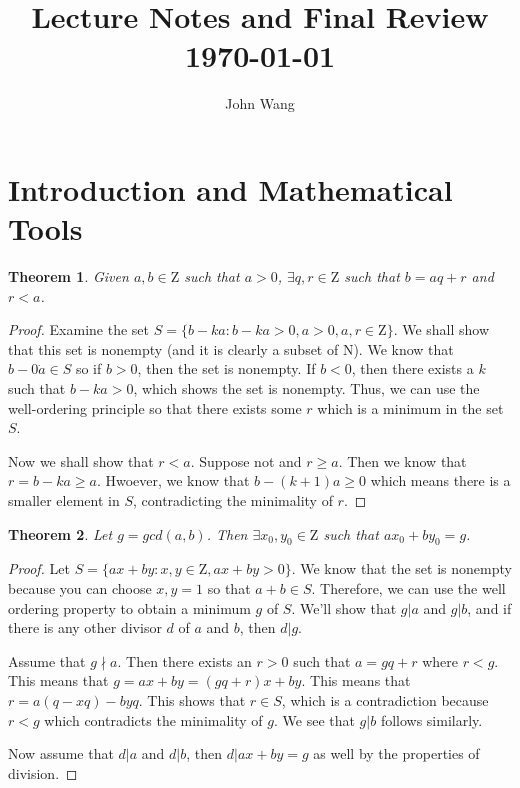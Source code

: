 \documentclass[psamsfonts]{amsart}
\title{Lecture Notes and Final Review\\
\today}
\author{John Wang}
\newtheorem{thm}{Theorem}[section]
\theoremstyle{definition}
\theoremstyle{remark}
\numberwithin{equation}{section}
\begin{document}
\maketitle


\section{Introduction and Mathematical Tools}

\begin{thm}
Given $a,b \in \mathrm{Z}$ such that $a > 0$, $\exists q, r \in \mathrm{Z}$ such that $b = aq + r$ and $r < a$. 
\end{thm}

\begin{proof}
Examine the set $S = \{ b - ka: b - ka > 0, a > 0, a,r \in \mathrm{Z} \}$. We shall show that this set is nonempty (and it is clearly a subset of $\mathrm{N}$). We know that $b - 0 \dot a \in S$ so if $b > 0$, then the set is nonempty. If $b < 0$, then there exists a $k$ such that $b - ka > 0$, which shows the set is nonempty. Thus, we can use the well-ordering principle so that there exists some $r$ which is a minimum in the set $S$. 

Now we shall show that $r < a$. Suppose not and $r \geq a$. Then we know that $r = b - ka \geq a$. Hwoever, we know that $b - (k+1) a \geq 0$ which means there is a smaller element in $S$, contradicting the minimality of $r$. 
\end{proof}

\begin{thm}
Let $g = gcd(a,b)$. Then $\exists x_0, y_0 \in \mathrm{Z}$ such that $a x_0  + b y_0 = g$. 
\end{thm}

\begin{proof}
Let $S = \{ ax + by : x, y \in \mathrm{Z}, ax + by > 0 \}$. We know that the set is nonempty because you can choose $x,y = 1$ so that $a + b \in S$. Therefore, we can use the well ordering property to obtain a minimum $g$ of $S$. We'll show that $g | a$ and $g | b$, and if there is any other divisor $d$ of $a$ and $b$, then $d | g$. 

Assume that $g \nmid a$. Then there exists an $r > 0$ such that $a = gq + r$ where $r < g$. This means that $g = ax + by = (gq + r)x + by$. This means that $r = a ( q - xq) - byq$. This shows that $r \in S$, which is a contradiction because $r < g$ which contradicts the minimality of $g$. We see that $g | b$ follows similarly. 

Now assume that $d | a$ and $d|b$, then $d | ax + by = g$ as well by the properties of division. 
\end{proof}
\end{document}
